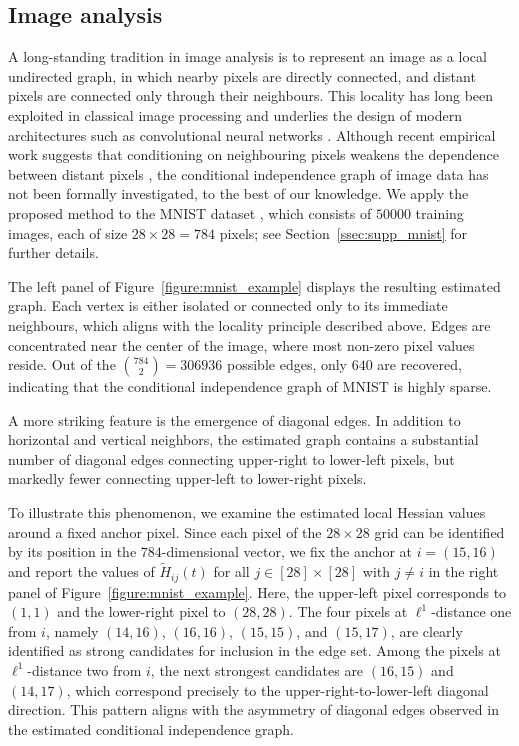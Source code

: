 \documentclass[11pt,a4paper,final]{article}
\numberwithin{equation}{section}
\theoremstyle{remark}
\begin{document}
\subsection{Image analysis}
\label{ssec:image}

A long-standing tradition in image analysis is to represent an image as a local undirected graph, in which nearby pixels are directly connected, and distant pixels are connected only through their neighbours.
This locality has long been exploited in classical image processing \citep{li2009markov} and underlies the design of modern architectures such as convolutional neural networks \citep{krizhevsky2012imagenet, goodfellow2016deep}.
Although recent empirical work suggests that conditioning on neighbouring pixels weakens the dependence between distant pixels \citep{vandermeulen2024breaking, vandermeulen2025dimension}, the conditional independence graph of image data has not been formally investigated, to the best of our knowledge.
We apply the proposed method to the MNIST dataset \citep{lecun1989handwritten}, which consists of $50000$ training images, each of size $28 \times 28 = 784$ pixels; see Section~\ref{ssec:supp_mnist} for further details.

The left panel of Figure~\ref{figure:mnist_example} displays the resulting estimated graph.
Each vertex is either isolated or connected only to its immediate neighbours, which aligns with the locality principle described above.
Edges are concentrated near the center of the image, where most non-zero pixel values reside.
Out of the $\binom{784}{2} = 306936$ possible edges, only $640$ are recovered, indicating that the conditional independence graph of MNIST is highly sparse.

A more striking feature is the emergence of diagonal edges. In addition to horizontal and vertical neighbors, the estimated graph contains a substantial number of diagonal edges connecting upper-right to lower-left pixels, but markedly fewer connecting upper-left to lower-right pixels.

To illustrate this phenomenon, we examine the estimated local Hessian values around a fixed anchor pixel.
Since each pixel of the $28 \times 28$ grid can be identified by its position in the $784$-dimensional vector, we fix the anchor at $i = (15, 16)$ and report the values of $\widetilde H_{ij}(t)$ for all $j \in [28] \times [28]$ with $j \neq i$ in the right panel of Figure~\ref{figure:mnist_example}.
Here, the upper-left pixel corresponds to $(1, 1)$ and the lower-right pixel to $(28, 28)$.
The four pixels at $\ell^{1}$-distance one from $i$, namely $(14, 16)$, $(16, 16)$, $(15, 15)$, and $(15, 17)$, are clearly identified as strong candidates for inclusion in the edge set.
Among the pixels at $\ell^{1}$-distance two from $i$, the next strongest candidates are $(16, 15)$ and $(14, 17)$, which correspond precisely to the upper-right-to-lower-left diagonal direction.
This pattern aligns with the asymmetry of diagonal edges observed in the estimated conditional independence graph.
\end{document}
